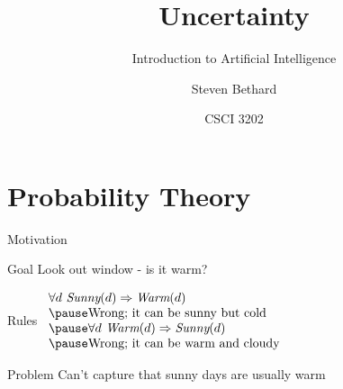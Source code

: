 \documentclass[12pt]{beamer}
\title{Uncertainty}
\subtitle{Introduction to Artificial Intelligence}
\author{Steven Bethard}
\institute{
  Department of Computer Science\\
  University of Colorado
}
\date{CSCI 3202}
\newcommand{\EM}[1]{\mbox{\em#1}}
\begin{document}
\begin{frame}
	\titlepage
\end{frame}

\section{Probability Theory}
\begin{frame}{Motivation}
	\begin{block}{Goal}
		Look out window - is it warm?
	\end{block}
	\pause
	\begin{block}{Rules}
		$
		\begin{array}{l}
			\forall d\ \EM{Sunny}(d) \Rightarrow \EM{Warm}(d) \\
			\pause \mbox{Wrong; it can be sunny but cold} \\
			\pause \forall d\ \EM{Warm}(d) \Rightarrow \EM{Sunny}(d) \\
			\pause\mbox{Wrong; it can be warm and cloudy} \\
		\end{array}
		$
	\end{block}
	\pause
	\begin{block}{Problem}
		Can't capture that sunny days are usually warm
	\end{block}
\end{frame}
\end{document}
